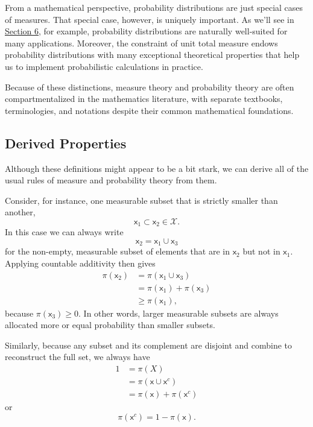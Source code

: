 \documentclass[
  letterpaper,
  DIV=11,
  numbers=noendperiod]{scrartcl}
\begin{document}
From a mathematical perspective, probability distributions are just
special cases of measures. That special case, however, is uniquely
important. As we'll see in \hyperref[sec:interpretations]{Section 6},
for example, probability distributions are naturally well-suited for
many applications. Moreover, the constraint of unit total measure endows
probability distributions with many exceptional theoretical properties
that help us to implement probabilistic calculations in practice.

Because of these distinctions, measure theory and probability theory are
often compartmentalized in the mathematics literature, with separate
textbooks, terminologies, and notations despite their common
mathematical foundations.

\subsection{Derived Properties}\label{derived-properties}

Although these definitions might appear to be a bit stark, we can derive
all of the usual rules of measure and probability theory from them.

Consider, for instance, one measurable subset that is strictly smaller
than another, \[
\mathsf{x}_{1} \subset \mathsf{x}_{2} \in \mathcal{X}.
\] In this case we can always write \[
\mathsf{x}_{2} = \mathsf{x}_{1} \cup \mathsf{x}_{3}
\] for the non-empty, measurable subset of elements that are in
\(\mathsf{x}_{2}\) but not in \(\mathsf{x}_{1}\). Applying countable
additivity then gives \begin{align*}
\pi(\mathsf{x}_{2})
&= \pi(\mathsf{x}_{1} \cup \mathsf{x}_{3})
\\
&= \pi(\mathsf{x}_{1}) + \pi(\mathsf{x}_{3})
\\
&\ge \pi(\mathsf{x}_{1}),
\end{align*} because \(\pi(\mathsf{x}_{3}) \ge 0\). In other words,
larger measurable subsets are always allocated more or equal probability
than smaller subsets.

Similarly, because any subset and its complement are disjoint and
combine to reconstruct the full set, we always have \begin{align*}
1
&= \pi(X)
\\
&= \pi(\mathsf{x} \cup \mathsf{x}^{c})
\\
&= \pi(\mathsf{x}) + \pi(\mathsf{x}^{c})
\end{align*} or \[
\pi(\mathsf{x}^{c}) = 1 - \pi(\mathsf{x}).
\]
\end{document}
